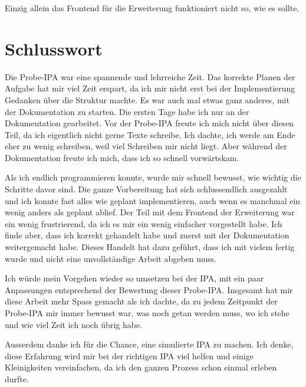 Einzig allein das Frontend für die Erweiterung funktioniert nicht so, wie es sollte.

\section{Schlusswort}
Die Probe-IPA war eine spannende und lehrreiche Zeit. Das korrekte Planen der Aufgabe hat mir viel Zeit erspart, da ich mir nicht erst bei der Implementierung Gedanken über die Struktur machte. Es war auch mal etwas ganz anderes, mit der Dokumentation zu starten. Die ersten Tage habe ich nur an der Dokumentation gearbeitet. Vor der Probe-IPA freute ich mich nicht über diesen Teil, da ich eigentlich nicht gerne Texte schreibe. Ich dachte, ich werde am Ende eher zu wenig schreiben, weil viel Schreiben mir nicht liegt. Aber während der Dokumentation freute ich mich, dass ich so schnell vorwärtskam.

Als ich endlich programmieren konnte, wurde mir schnell bewusst, wie wichtig die Schritte davor sind. Die ganze Vorbereitung hat sich schlussendlich ausgezahlt und ich konnte fast alles wie geplant implementieren, auch wenn es manchmal ein wenig anders als geplant ablief. Der Teil mit dem Frontend der Erweiterung war ein wenig frustrierend, da ich es mir ein wenig einfacher vorgestellt habe. Ich finde aber, dass ich korrekt gehandelt habe und zuerst mit der Dokumentation weitergemacht habe. Dieses Handelt hat dazu geführt, dass ich mit vielem fertig wurde und nicht eine unvollständige Arbeit abgeben muss.

Ich würde mein Vorgehen wieder so umsetzen bei der IPA, mit ein paar Anpassungen entsprechend der Bewertung dieser Probe-IPA. Insgesamt hat mir diese Arbeit mehr Spass gemacht als ich dachte, da zu jedem Zeitpunkt der Probe-IPA mir immer bewusst war, was noch getan werden muss, wo ich stehe und wie viel Zeit ich noch übrig habe.

Ausserdem danke ich für die Chance, eine simulierte IPA zu machen. Ich denke, diese Erfahrung wird mir bei der richtigen IPA viel helfen und einige Kleinigkeiten vereinfachen, da ich den ganzen Prozess schon einmal erleben durfte.

\newpage